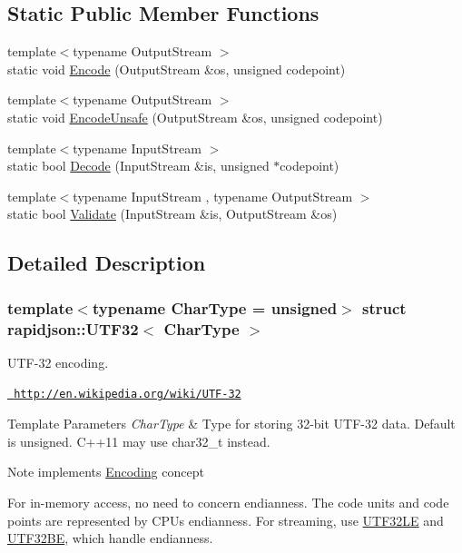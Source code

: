 \subsection*{Static Public Member Functions}
\begin{DoxyCompactItemize}
\item 
{\footnotesize template$<$typename Output\+Stream $>$ }\\static void \mbox{\hyperlink{structrapidjson_1_1_u_t_f32_a3b0052772242f79904a11c1fd69ba7a8}{Encode}} (Output\+Stream \&os, unsigned codepoint)
\item 
{\footnotesize template$<$typename Output\+Stream $>$ }\\static void \mbox{\hyperlink{structrapidjson_1_1_u_t_f32_af6bd3135243287cb9d8cb26401cddfed}{Encode\+Unsafe}} (Output\+Stream \&os, unsigned codepoint)
\item 
{\footnotesize template$<$typename Input\+Stream $>$ }\\static bool \mbox{\hyperlink{structrapidjson_1_1_u_t_f32_a196e9da00366c3fce8ca5b56634d110a}{Decode}} (Input\+Stream \&is, unsigned $\ast$codepoint)
\item 
{\footnotesize template$<$typename Input\+Stream , typename Output\+Stream $>$ }\\static bool \mbox{\hyperlink{structrapidjson_1_1_u_t_f32_a51a4dccb78915bba67217ace12d294db}{Validate}} (Input\+Stream \&is, Output\+Stream \&os)
\end{DoxyCompactItemize}


\subsection{Detailed Description}
\subsubsection*{template$<$typename Char\+Type = unsigned$>$\newline
struct rapidjson\+::\+U\+T\+F32$<$ Char\+Type $>$}

U\+T\+F-\/32 encoding. 

\href{http://en.wikipedia.org/wiki/UTF-32}{\texttt{ http\+://en.\+wikipedia.\+org/wiki/\+U\+T\+F-\/32}} 
\begin{DoxyTemplParams}{Template Parameters}
{\em Char\+Type} & Type for storing 32-\/bit U\+T\+F-\/32 data. Default is unsigned. C++11 may use char32\+\_\+t instead. \\
\hline
\end{DoxyTemplParams}
\begin{DoxyNote}{Note}
implements \mbox{\hyperlink{classrapidjson_1_1_encoding}{Encoding}} concept

For in-\/memory access, no need to concern endianness. The code units and code points are represented by C\+PU\textquotesingle{}s endianness. For streaming, use \mbox{\hyperlink{structrapidjson_1_1_u_t_f32_l_e}{U\+T\+F32\+LE}} and \mbox{\hyperlink{structrapidjson_1_1_u_t_f32_b_e}{U\+T\+F32\+BE}}, which handle endianness. 
\end{DoxyNote}


